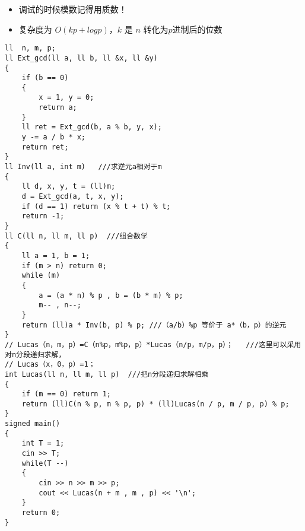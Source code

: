 \documentclass[E:/GsjzTle/main/main.tex]{subfiles}
\begin{document}
\begin{itemize}
\item
  调试的时候模数记得用质数！
\item
  复杂度为 \(O(kp+logp)\)，\(k\) 是 \(n\) 转化为\(p\)进制后的位数
\end{itemize}

\begin{lstlisting}
ll  n, m, p;
ll Ext_gcd(ll a, ll b, ll &x, ll &y)
{
	if (b == 0)
	{
		x = 1, y = 0;
		return a;
	}
	ll ret = Ext_gcd(b, a % b, y, x);
	y -= a / b * x;
	return ret;
}
ll Inv(ll a, int m)   ///求逆元a相对于m
{
	ll d, x, y, t = (ll)m;
	d = Ext_gcd(a, t, x, y);
	if (d == 1) return (x % t + t) % t;
	return -1;
}
ll C(ll n, ll m, ll p)  ///组合数学
{
	ll a = 1, b = 1;
	if (m > n) return 0;
	while (m)
	{
		a = (a * n) % p , b = (b * m) % p;
		m-- , n--;
	}
	return (ll)a * Inv(b, p) % p; ///（a/b）%p 等价于 a*（b，p）的逆元
}
// Lucas（n，m，p）=C（n%p，m%p，p）*Lucas（n/p，m/p，p）；   ///这里可以采用对n分段递归求解，
// Lucas（x，0，p）=1；
int Lucas(ll n, ll m, ll p)  ///把n分段递归求解相乘
{
	if (m == 0) return 1;
	return (ll)C(n % p, m % p, p) * (ll)Lucas(n / p, m / p, p) % p;
}
signed main()
{
	int T = 1;
	cin >> T;
	while(T --)
	{
		cin >> n >> m >> p;
		cout << Lucas(n + m , m , p) << '\n';
	}
	return 0;
}
\end{lstlisting}
\end{document}
